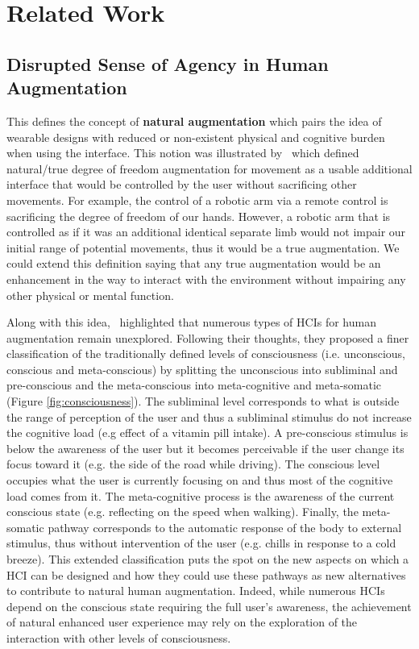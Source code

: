 \section{Related Work}

\subsection{Disrupted Sense of Agency in Human Augmentation}

This defines the concept of \textbf{natural augmentation} which pairs the idea of wearable designs with reduced or non-existent physical and cognitive burden when using the interface. This notion was illustrated by~\citet{Eden2021-og} which defined natural/true degree of freedom augmentation for movement as a usable additional interface that would be controlled by the user without sacrificing other movements. For example, the control of a robotic arm via a remote control is sacrificing the degree of freedom of our hands. However, a robotic arm that is controlled as if it was an additional identical separate limb would not impair our initial range of potential movements, thus it would be a true augmentation. We could extend this definition saying that any true augmentation would be an enhancement in the way to interact with the environment without impairing any other physical or mental function.

Along with this idea,~\citet{Jain2020-og} highlighted that numerous types of HCIs for human augmentation remain unexplored. Following their thoughts, they proposed a finer classification of the traditionally defined levels of consciousness (i.e. unconscious, conscious and meta-conscious) by splitting the unconscious into subliminal and pre-conscious and the meta-conscious into meta-cognitive and meta-somatic (Figure \ref{fig:consciousness}). The subliminal level corresponds to what is outside the range of perception of the user and thus a subliminal stimulus do not increase the cognitive load (e.g effect of a vitamin pill intake). A pre-conscious stimulus is below the awareness of the user but it becomes perceivable if the user change its focus toward it (e.g. the side of the road while driving). The conscious level occupies what the user is currently focusing on and thus most of the cognitive load comes from it. The meta-cognitive process is the awareness of the current conscious state (e.g. reflecting on the speed when walking). Finally, the meta-somatic pathway corresponds to the automatic response of the body to external stimulus, thus without intervention of the user (e.g. chills in response to a cold breeze).
This extended classification puts the spot on the new aspects on which a HCI can be designed and how they could use these pathways as new alternatives to contribute to natural human augmentation. Indeed, while numerous HCIs depend on the conscious state requiring the full user's awareness, the achievement of natural enhanced user experience may rely on the exploration of the interaction with other levels of consciousness.

